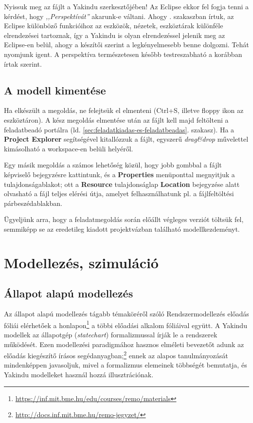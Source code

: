 Nyissuk meg az  fájlt a Yakindu szerkesztőjében! Az Eclipse ekkor fel fogja tenni a kérdést, hogy \emph{,,Perspektívát''} akarunk-e váltani. Ahogy . szakaszban írtuk, az Eclipse különböző funkcióihoz az eszközök, nézetek, eszköztárak különféle elrendezései tartoznak, így a Yakindu is olyan elrendezéssel jelenik meg az Eclipse-en belül, ahogy a készítői szerint a legkényelmesebb benne dolgozni. Tehát nyomjunk igent. A perspektíva természetesen később testreszabható a korábban írtak szerint.

\subsection{A modell kimentése}
\label{sec:a-modell-kimentese}

Ha elkészült a megoldás, ne felejtsük el elmenteni (Ctrl+S, illetve floppy ikon az eszköztáron). A kész megoldás elmentése után az  fájlt kell majd feltölteni a feladatbeadó portálra (ld. \ref{sec:feladatkiadas-es-feladatbeadas}. szakasz). Ha a \textbf{Project Explorer} segítségével kitallózzuk a fájlt, egyszerű \emph{drag\&drop} művelettel kimásolható a workspace-en belüli helyéről.

Egy másik megoldás a számos lehetőség közül, hogy jobb gombbal a fájlt képviselő bejegyzésre kattintunk, és a \textbf{Properties} menüponttal megnyitjuk a tulajdonságablakot; ott a \textbf{Resource} tulajdonságlap \textbf{Location} bejegyzése alatt olvasható a fájl teljes elérési útja, amelyet felhasználhatunk pl. a fájlfeltöltési párbeszédablakban.

Ügyeljünk arra, hogy a feladatmegoldás során előállt végleges verziót töltsük fel, semmiképp se az eredetileg kiadott projektvázban található modellkezdeményt.


\section{Modellezés, szimuláció}

\subsection{Állapot alapú modellezés}

Az állapot alapú modellezés tágabb témaköréről szóló Rendszermodellezés előadás fóliái elérhetőek a honlapon\footnote{\url{https://inf.mit.bme.hu/edu/courses/remo/materials}} a többi előadási alkalom fóliáival együtt. A Yakindu modellek az állapotgép (\emph{statechart}) formalizmussal írják le a rendszerek működését. Ezen modellezési paradigmához hasznos elméleti bevezetőt adunk az előadás kiegészítő írásos segédanyagban;\footnote{\url{http://docs.inf.mit.bme.hu/remo-jegyzet/}} ennek az alapos tanulmányozását mindenképpen javasoljuk, mivel a formalizmus elemeinek többségét bemutatja, és Yakindu modelleket használ hozzá illusztrációnak.

